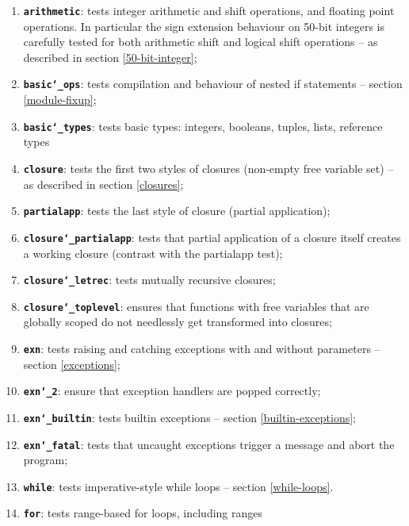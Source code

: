 \documentclass[12pt,a4paper,twoside,openright]{report}
\begin{document}
\begin{enumerate}
    \item \textbf{\texttt{arithmetic}}: tests integer arithmetic and shift
        operations, and floating point operations. In particular the sign
        extension behaviour on 50-bit integers is carefully tested for both
        arithmetic shift and logical shift operations -- as described in
        section \ref{50-bit-integer};
    \item \textbf{\texttt{basic\char`_ops}}: tests compilation and behaviour of
        nested if statements -- section \ref{module-fixup};
    \item \textbf{\texttt{basic\char`_types}}: tests basic types: integers,
        booleans, tuples, lists, reference types
    \item \textbf{\texttt{closure}}: tests the first two styles of closures
        (non-empty free variable set) -- as described in section
        \ref{closures};
    \item \textbf{\texttt{partialapp}}: tests the last style of closure
        (partial application);
    \item \textbf{\texttt{closure\char`_partialapp}}: tests that partial
        application of a closure itself creates a working closure (contrast
        with the partialapp test);
    \item \textbf{\texttt{closure\char`_letrec}}: tests mutually recursive
        closures;
    \item \textbf{\texttt{closure\char`_toplevel}}: ensures that functions with
        free variables that are globally scoped do not needlessly get
        transformed into closures;
    \item \textbf{\texttt{exn}}: tests raising and catching exceptions with and
        without parameters -- section \ref{exceptions};
    \item \textbf{\texttt{exn\char`_2}}: ensure that exception handlers are
        popped correctly;
    \item \textbf{\texttt{exn\char`_builtin}}: tests builtin exceptions --
        section \ref{builtin-exceptions};
    \item \textbf{\texttt{exn\char`_fatal}}: tests that uncaught exceptions
        trigger a message and abort the program;
    \item \textbf{\texttt{while}}: tests imperative-style while loops --
        section \ref{while-loops}.
    \item \textbf{\texttt{for}}: tests range-based for loops, including ranges

\end{enumerate}
\end{document}
